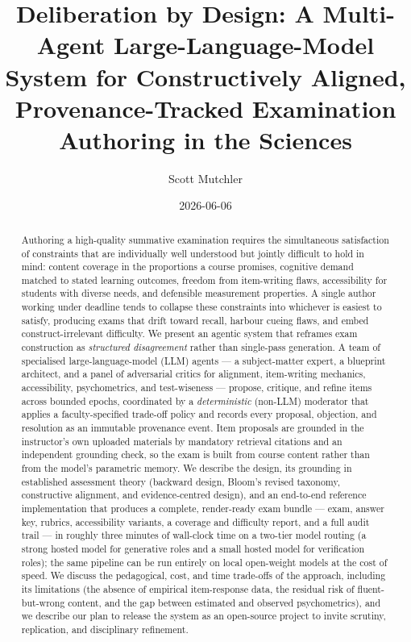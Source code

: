 \documentclass[
  11pt,
  letterpaper,
]{article}
\title{Deliberation by Design: A Multi-Agent Large-Language-Model System
for Constructively Aligned, Provenance-Tracked Examination Authoring in
the Sciences}
\author{Scott Mutchler}
\date{2026-06-06}
\begin{document}
\maketitle
\begin{abstract}
Authoring a high-quality summative examination requires the simultaneous
satisfaction of constraints that are individually well understood but
jointly difficult to hold in mind: content coverage in the proportions a
course promises, cognitive demand matched to stated learning outcomes,
freedom from item-writing flaws, accessibility for students with diverse
needs, and defensible measurement properties. A single author working
under deadline tends to collapse these constraints into whichever is
easiest to satisfy, producing exams that drift toward recall, harbour
cueing flaws, and embed construct-irrelevant difficulty. We present an
agentic system that reframes exam construction as \emph{structured
disagreement} rather than single-pass generation. A team of specialised
large-language-model (LLM) agents --- a subject-matter expert, a
blueprint architect, and a panel of adversarial critics for alignment,
item-writing mechanics, accessibility, psychometrics, and test-wiseness
--- propose, critique, and refine items across bounded epochs,
coordinated by a \emph{deterministic} (non-LLM) moderator that applies a
faculty-specified trade-off policy and records every proposal,
objection, and resolution as an immutable provenance event. Item
proposals are grounded in the instructor's own uploaded materials by
mandatory retrieval citations and an independent grounding check, so the
exam is built from course content rather than from the model's
parametric memory. We describe the design, its grounding in established
assessment theory (backward design, Bloom's revised taxonomy,
constructive alignment, and evidence-centred design), and an end-to-end
reference implementation that produces a complete, render-ready exam
bundle --- exam, answer key, rubrics, accessibility variants, a coverage
and difficulty report, and a full audit trail --- in roughly three
minutes of wall-clock time on a two-tier model routing (a strong hosted
model for generative roles and a small hosted model for verification
roles); the same pipeline can be run entirely on local open-weight
models at the cost of speed. We discuss the pedagogical, cost, and time
trade-offs of the approach, including its limitations (the absence of
empirical item-response data, the residual risk of fluent-but-wrong
content, and the gap between estimated and observed psychometrics), and
we describe our plan to release the system as an open-source project to
invite scrutiny, replication, and disciplinary refinement.
\end{abstract}
\end{document}
